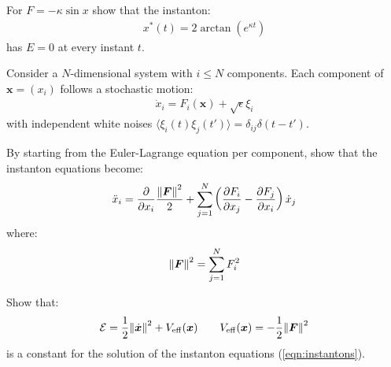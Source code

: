 \documentclass[../template.tex]{subfiles}
\begin{document}
\begin{exo}
    For $F=-\kappa \sin x$ show that the instanton:
    \begin{align*}
        x^*(t) = 2\arctan (e^{\kappa t})
    \end{align*}
    has  $E=0$ at every instant $t$.
\end{exo}

\begin{exo}
    Consider a $N$-dimensional system with $i \leq N$ components. Each component of $\bm{x} = (x_i)$ follows a stochastic motion:
    \begin{align*}
        \dot{x}_i = F_i(\bm{x}) + \sqrt{\epsilon} \xi_i
    \end{align*}
    with independent white noises $\langle \xi_i(t) \xi_j (t')\rangle = \delta_{ij} \delta(t-t')$.

    By starting from the Euler-Lagrange equation per component, show that the instanton equations become:
    \begin{align} \label{eqn:instantons}
        \ddot{x}_i = \pdv{x_i} \frac{\norm{\bm{F}}^2}{2} + \sum_{j=1}^N \left(\pdv{F_i}{x_j} - \pdv{F_j}{x_i}\right)  \dot{x}_j
    \end{align}
    where:
    \begin{align*}
        \norm{\bm{F}}^2 = \sum_{j=1}^N F_i^2
    \end{align*}
\end{exo}

\begin{exo}
    Show that:
    \begin{align*}
        \mathcal{E}= \frac{1}{2} \norm{\dot{\bm{x}}}^2 + V_{\mathrm{eff} }(\bm{x}) \qquad V_{\mathrm{eff} }(\bm{x}) = -\frac{1}{2} \norm{\bm{F}}^2   
    \end{align*}
    is a constant for the solution of the instanton equations (\ref{eqn:instantons}).
\end{exo}
\end{document}
